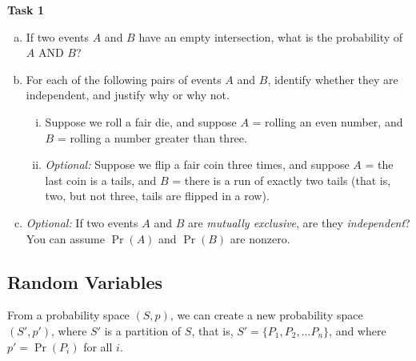 \documentclass[12pt,letterpaper]{article}
\newenvironment{22enumerate}{\begin{enumerate}[a.]\itemsep0em}{\end{enumerate}}
\begin{document}
\textbf{Task 1}
\begin{22enumerate}
    \item If two events $A$ and $B$ have an empty intersection, what is the probability of $A$ AND $B$?

    \begin{mdframed} \vspace{0.5cm} \end{mdframed}

    \item For each of the following pairs of events $A$ and $B$, identify whether they are independent, and justify why or why not.

    \begin{enumerate}[i.]

        \item Suppose we roll a fair die, and suppose $A$ = rolling an even number, and $B$ = rolling a number greater than three.
        \begin{mdframed} \vspace{1.5cm} \end{mdframed}
    
        \item \textit{Optional:} Suppose we flip a fair coin three times, and suppose $A$ = the last coin is a tails, and $B$ = there is a run of exactly two tails (that is, two, but not three, tails are flipped in a row). 
        \begin{mdframed} \vspace{1.5cm} \end{mdframed}

    \end{enumerate}
    
    \item \textit{Optional:} If two events $A$ and $B$ are \textit{mutually exclusive}, are they \textit{independent}? You can assume $\Pr(A)$ and $\Pr(B)$ are nonzero.
    \begin{mdframed} \vspace{1cm} \end{mdframed}
\end{22enumerate}

\subsection*{Random Variables}

From a probability space $(S, p)$, we can create a new probability space $(S', p')$, where $S'$ is a partition of $S$, that is, $S' = \{P_1, P_2, ... P_n\}$, and where $p' = \Pr(P_i)$ for all $i$. 
\end{document}
